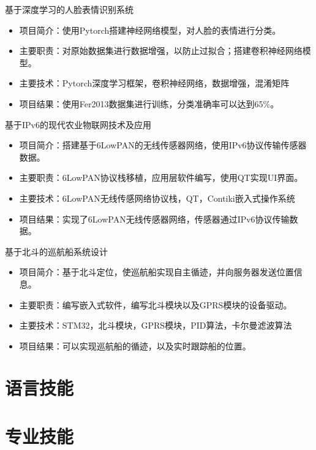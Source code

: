 \documentclass[11pt, a4paper]{moderncv}
\begin{document}
	{基于深度学习的人脸表情识别系统}
	{}{}{}{
		\begin{itemize}
			\item 项目简介：使用Pytorch搭建神经网络模型，对人脸的表情进行分类。
			\item 主要职责：对原始数据集进行数据增强，以防止过拟合；搭建卷积神经网络模型。
			\item 主要技术：Pytorch深度学习框架，卷积神经网络，数据增强，混淆矩阵
			\item 项目结果：使用Fer2013数据集进行训练，分类准确率可以达到65\%。
	\end{itemize}}{}

	{基于IPv6的现代农业物联网技术及应用}
	{}{}{}{
		\begin{itemize}
			\item 项目简介：搭建基于6LowPAN的无线传感器网络，使用IPv6协议传输传感器数据。
			\item 主要职责：6LowPAN协议栈移植，应用层软件编写，使用QT实现UI界面。
			\item 主要技术：6LowPAN无线传感网络协议栈，QT，Contiki嵌入式操作系统
			\item 项目结果：实现了6LowPAN无线传感器网络，传感器通过IPv6协议传输数据。
	\end{itemize}}{}

	{基于北斗的巡航船系统设计}
	{}{}{}{
		\begin{itemize}
			\item 项目简介：基于北斗定位，使巡航船实现自主循迹，并向服务器发送位置信息。
			\item 主要职责：编写嵌入式软件，编写北斗模块以及GPRS模块的设备驱动。
			\item 主要技术：STM32，北斗模块，GPRS模块，PID算法，卡尔曼滤波算法
			\item 项目结果：可以实现巡航船的循迹，以及实时跟踪船的位置。
	\end{itemize}}{}

	\section{语言技能}

	\section{专业技能}
\end{document}
